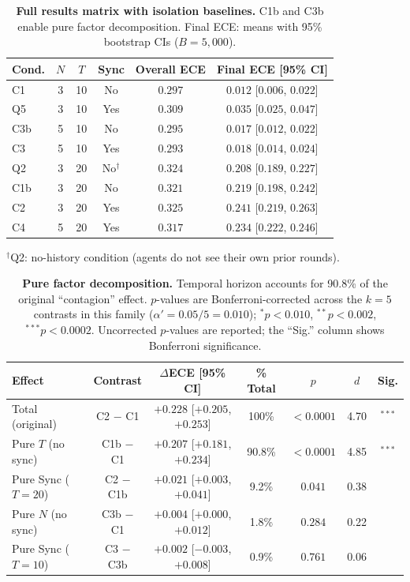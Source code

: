 \documentclass[11pt]{article}
\begin{document}
\begin{table}[H]
\centering
\caption{\textbf{Full results matrix with isolation baselines.} C1b and C3b enable pure factor decomposition. Final ECE: means with 95\% bootstrap CIs ($B{=}5{,}000$).}
\label{tab:results}
\begin{tabular}{@{}lccccc@{}}
\toprule
Cond. & $N$ & $T$ & Sync & Overall ECE & Final ECE [95\% CI] \\
\midrule
C1  & 3 & 10 & No  & $0.297$ & $0.012$ [$0.006$, $0.022$] \\
Q5  & 3 & 10 & Yes & $0.309$ & $0.035$ [$0.025$, $0.047$] \\
C3b & 5 & 10 & No  & $0.295$ & $0.017$ [$0.012$, $0.022$] \\
C3  & 5 & 10 & Yes & $0.293$ & $0.018$ [$0.014$, $0.024$] \\
\midrule
Q2  & 3 & 20 & No$^\dagger$ & $0.324$ & $0.208$ [$0.189$, $0.227$] \\
C1b & 3 & 20 & No  & $0.321$ & $0.219$ [$0.198$, $0.242$] \\
C2  & 3 & 20 & Yes & $0.325$ & $0.241$ [$0.219$, $0.263$] \\
C4  & 5 & 20 & Yes & $0.317$ & $0.234$ [$0.222$, $0.246$] \\
\bottomrule
\end{tabular}
\smallskip
{\footnotesize $^\dagger$Q2: no-history condition (agents do not see their own prior rounds).}
\end{table}

\begin{table}[H]
\centering
\caption{\textbf{Pure factor decomposition.} Temporal horizon accounts for 90.8\% of the original ``contagion'' effect. $p$-values are Bonferroni-corrected across the $k{=}5$ contrasts in this family ($\alpha' = 0.05/5 = 0.010$); $^{*}p<0.010$, $^{**}p<0.002$, $^{***}p<0.0002$. Uncorrected $p$-values are reported; the ``Sig.'' column shows Bonferroni significance.}
\label{tab:decomp}
\begin{tabular}{@{}lcccccc@{}}
\toprule
Effect & Contrast & $\Delta$ECE [95\% CI] & \% Total & $p$ & $d$ & Sig. \\
\midrule
Total (original) & C2 $-$ C1 & $+0.228$ [$+0.205$, $+0.253$] & 100\% & $<0.0001$ & 4.70 & $^{***}$ \\
Pure $T$ (no sync) & C1b $-$ C1 & $+0.207$ [$+0.181$, $+0.234$] & 90.8\% & $<0.0001$ & 4.85 & $^{***}$ \\
Pure Sync ($T{=}20$) & C2 $-$ C1b & $+0.021$ [$+0.003$, $+0.041$] & 9.2\% & $0.041$ & 0.38 & \\
Pure $N$ (no sync) & C3b $-$ C1 & $+0.004$ [$+0.000$, $+0.012$] & 1.8\% & $0.284$ & 0.22 & \\
Pure Sync ($T{=}10$) & C3 $-$ C3b & $+0.002$ [$-0.003$, $+0.008$] & 0.9\% & $0.761$ & 0.06 & \\
\bottomrule
\end{tabular}
\end{table}
\end{document}
